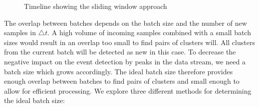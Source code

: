 \begin{figure}[h]
    \centering


    \caption{Timeline showing the sliding window approach}
    \label{fig:timeline}
\end{figure}

The overlap between batches depends on the batch size and the number of new samples in $\triangle t$. A high volume of incoming samples combined with a small batch sizes would result in an overlap too small to find pairs of clusters will. All clusters from the current batch will be detected as new in this case. To decrease the negative impact on the event detection by peaks in the data stream, we need a batch size which grows accordingly. The ideal batch size therefore provides enough overlap between batches to find pairs of clusters and small enough to allow for efficient processing. We explore three different methods for determining the ideal batch size:

